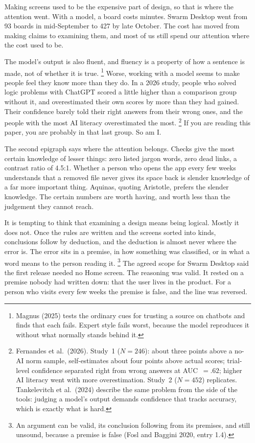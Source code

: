 \documentclass[11pt,a4paper]{article}
\newcommand{\KeepLines}[1]{\par\vskip 0pt plus #1\baselineskip\penalty-200\vskip 0pt plus -#1\baselineskip}
\newcommand{\Head}[1]{%
  \KeepLines{6}\vspace{6mm}{\large\itshape #1}\par\vspace{2mm}\noindent\ignorespaces}
\newcounter{art}
\begin{document}
\Head{Why now}
Making screens used to be the expensive part of design, so that is where the attention went. With a model, a board costs minutes. Swarm Desktop went from 93 boards in mid-September to 427 by late October. The cost has moved from making claims to examining them, and most of us still spend our attention where the cost used to be.

The model's output is also fluent, and fluency is a property of how a sentence is made, not of whether it is true.%
\footnote{Magnus (2025) tests the ordinary cues for trusting a source on chatbots and finds that each fails. Expert style fails worst, because the model reproduces it without what normally stands behind it.}
Worse, working with a model seems to make people feel they know more than they do. In a 2026 study, people who solved logic problems with ChatGPT scored a little higher than a comparison group without it, and overestimated their own scores by more than they had gained. Their confidence barely told their right answers from their wrong ones, and the people with the most AI literacy overestimated the most.%
\footnote{Fernandes et al.\ (2026). Study~1 ($N=246$): about three points above a no-AI norm sample, self-estimates about four points above actual scores; trial-level confidence separated right from wrong answers at AUC~$=.62$; higher AI literacy went with more overestimation. Study~2 ($N=452$) replicates. Tankelevitch et al.\ (2024) describe the same problem from the side of the tools: judging a model's output demands confidence that tracks accuracy, which is exactly what is hard.}
If you are reading this paper, you are probably in that last group. So am I.

The second epigraph says where the attention belongs. Checks give the most certain knowledge of lesser things: zero listed jargon words, zero dead links, a contrast ratio of 4.5:1. Whether a person who opens the app every few weeks understands that a removed file never gives its space back is slender knowledge of a far more important thing. Aquinas, quoting Aristotle, prefers the slender knowledge. The certain numbers are worth having, and worth less than the judgement they cannot reach.

\Head{Where design reasoning goes wrong}
It is tempting to think that examining a design means being logical. Mostly it does not. Once the rules are written and the screens sorted into kinds, conclusions follow by deduction, and the deduction is almost never where the error is. The error sits in a premise, in how something was classified, or in what a word means to the person reading it.%
\footnote{An argument can be valid, its conclusion following from its premises, and still unsound, because a premise is false (Fosl and Baggini 2020, entry 1.4).}
The agreed scope for Swarm Desktop said the first release needed no Home screen. The reasoning was valid. It rested on a premise nobody had written down: that the user lives in the product. For a person who visits every few weeks the premise is false, and the line was reversed.
\end{document}
